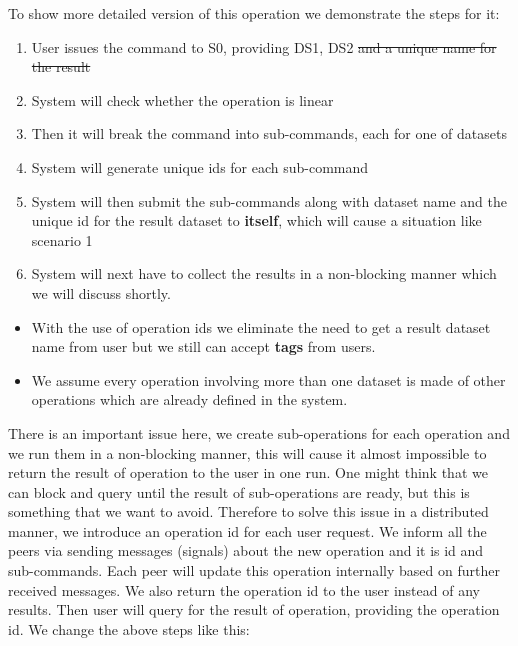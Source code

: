 To show more detailed version of this operation we demonstrate the steps for it:

\begin{enumerate}
\item User issues the command to S0, providing DS1, DS2 \st{and a unique name for the result}
\item System will check whether the operation is linear
\item Then it will break the command into sub-commands, each for one of datasets
\item System will generate unique ids for each sub-command
\item System will then submit the sub-commands along with dataset name and the unique id for the result dataset
to \textbf{itself}, which will cause a situation like scenario 1
\item System will next have to collect the results in a non-blocking manner which we will discuss shortly.
\end{enumerate}

\begin{itemize}
\item With the use of operation ids we eliminate the need to get a result dataset name from user but we still can accept \textbf{tags} from users.
\end{itemize}

\begin{itemize}
\item We assume every operation involving more than one dataset is made of other operations which are already defined in the system.
\end{itemize}

There is an important issue here, we create sub-operations for each operation and we run them in a non-blocking manner, this will
cause it almost impossible to return the result of operation to the user in one run. One might think that we can block and query
until the result of sub-operations are ready, but this is something that we want to avoid. Therefore to solve this issue in a 
distributed manner, we introduce an operation id for each user request. We inform all the peers via sending messages (signals) about
the new operation and it is id and sub-commands. Each peer will update this operation internally based on further received messages.
We also return the operation id to the user instead of any results. Then user will query for the result of operation, providing the 
operation id. We change the above steps like this:

